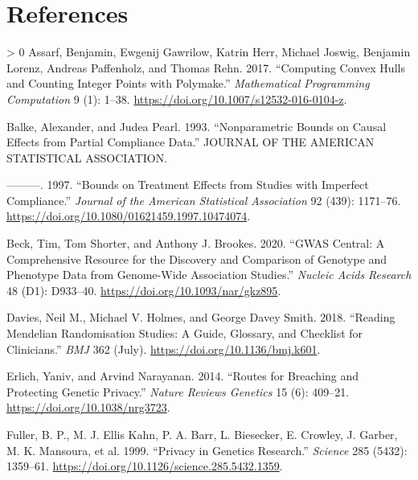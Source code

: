 \documentclass[
]{article}
\theoremstyle{plain}
\newlength{\cslhangindent}
\newenvironment{CSLReferences}[3] %
 {%
  \setlength{\parindent}{0pt}
  \ifodd #1 \everypar{\setlength{\hangindent}{\cslhangindent}}\ignorespaces\fi
  \ifnum #2 > 0
  \setlength{\parskip}{#2\baselineskip}
  \fi
 }%
 {}
\begin{document}
\hypertarget{references}{%
\section*{References}\label{references}}

\hypertarget{refs}{}
\begin{CSLReferences}{1}{0}
\leavevmode\hypertarget{ref-assarf_computing_2017}{}%
Assarf, Benjamin, Ewgenij Gawrilow, Katrin Herr, Michael Joswig, Benjamin Lorenz, Andreas Paffenholz, and Thomas Rehn. 2017. {``Computing Convex Hulls and Counting Integer Points with Polymake.''} \emph{Mathematical Programming Computation} 9 (1): 1--38. \url{https://doi.org/10.1007/s12532-016-0104-z}.

\leavevmode\hypertarget{ref-balke_nonparametric_1993}{}%
Balke, Alexander, and Judea Pearl. 1993. {``Nonparametric {Bounds} on {Causal Effects} from {Partial Compliance Data}.''} {JOURNAL OF THE AMERICAN STATISTICAL ASSOCIATION}.

\leavevmode\hypertarget{ref-balke_bounds_1997}{}%
---------. 1997. {``Bounds on {Treatment Effects} from {Studies} with {Imperfect Compliance}.''} \emph{Journal of the American Statistical Association} 92 (439): 1171--76. \url{https://doi.org/10.1080/01621459.1997.10474074}.

\leavevmode\hypertarget{ref-beck_gwas_2020}{}%
Beck, Tim, Tom Shorter, and Anthony J. Brookes. 2020. {``{GWAS Central}: A Comprehensive Resource for the Discovery and Comparison of Genotype and Phenotype Data from Genome-Wide Association Studies.''} \emph{Nucleic Acids Research} 48 (D1): D933--40. \url{https://doi.org/10.1093/nar/gkz895}.

\leavevmode\hypertarget{ref-davies_reading_2018}{}%
Davies, Neil M., Michael V. Holmes, and George Davey Smith. 2018. {``Reading {Mendelian} Randomisation Studies: A Guide, Glossary, and Checklist for Clinicians.''} \emph{BMJ} 362 (July). \url{https://doi.org/10.1136/bmj.k601}.

\leavevmode\hypertarget{ref-erlich_routes_2014}{}%
Erlich, Yaniv, and Arvind Narayanan. 2014. {``Routes for Breaching and Protecting Genetic Privacy.''} \emph{Nature Reviews Genetics} 15 (6): 409--21. \url{https://doi.org/10.1038/nrg3723}.

\leavevmode\hypertarget{ref-fuller_privacy_1999}{}%
Fuller, B. P., M. J. Ellis Kahn, P. A. Barr, L. Biesecker, E. Crowley, J. Garber, M. K. Mansoura, et al. 1999. {``Privacy in {Genetics Research}.''} \emph{Science} 285 (5432): 1359--61. \url{https://doi.org/10.1126/science.285.5432.1359}.


\end{CSLReferences}
\end{document}
